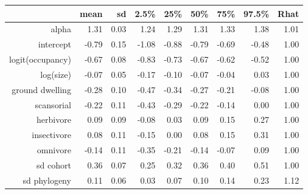 \begin{table}[ht]
\centering
\begin{tabular}{rrrrrrrrr}
  \hline
 & mean & sd & 2.5\% & 25\% & 50\% & 75\% & 97.5\% & Rhat \\ 
  \hline
alpha & 1.31 & 0.03 & 1.24 & 1.29 & 1.31 & 1.33 & 1.38 & 1.01 \\ 
  intercept & -0.79 & 0.15 & -1.08 & -0.88 & -0.79 & -0.69 & -0.48 & 1.00 \\ 
  logit(occupancy) & -0.67 & 0.08 & -0.83 & -0.73 & -0.67 & -0.62 & -0.52 & 1.00 \\ 
  log(size) & -0.07 & 0.05 & -0.17 & -0.10 & -0.07 & -0.04 & 0.03 & 1.00 \\ 
  ground dwelling & -0.28 & 0.10 & -0.47 & -0.34 & -0.27 & -0.21 & -0.08 & 1.00 \\ 
  scansorial & -0.22 & 0.11 & -0.43 & -0.29 & -0.22 & -0.14 & 0.00 & 1.00 \\ 
  herbivore & 0.09 & 0.09 & -0.08 & 0.03 & 0.09 & 0.15 & 0.27 & 1.00 \\ 
  insectivore & 0.08 & 0.11 & -0.15 & 0.00 & 0.08 & 0.15 & 0.31 & 1.00 \\ 
  omnivore & -0.14 & 0.11 & -0.35 & -0.21 & -0.14 & -0.07 & 0.09 & 1.00 \\ 
  sd cohort & 0.36 & 0.07 & 0.25 & 0.32 & 0.36 & 0.40 & 0.51 & 1.00 \\ 
  sd phylogeny & 0.11 & 0.06 & 0.03 & 0.07 & 0.10 & 0.14 & 0.23 & 1.12 \\ 
   \hline
\end{tabular}
\label{post_sum}
\end{table}
